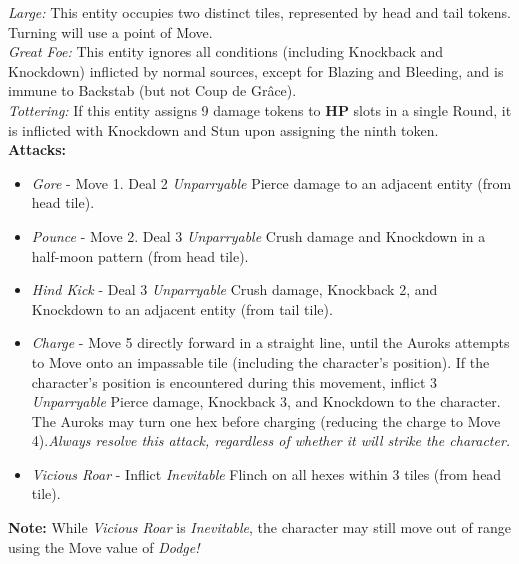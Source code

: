 \emph{Large:} This entity occupies two distinct tiles, represented by head and tail tokens. Turning will use a point of Move.\\

\emph{Great Foe:} This entity ignores all conditions (including Knockback and Knockdown) inflicted by normal sources, except for Blazing and Bleeding, and is immune to Backstab (but not Coup de Grâce).\\

\emph{Tottering:} If this entity assigns 9 damage tokens to \textbf{HP} slots in a single Round, it is inflicted with Knockdown and Stun upon assigning the ninth token.\\

\textbf{Attacks:}
\begin{itemize}
\item \emph{Gore} -  Move 1. Deal 2 \emph{Unparryable} Pierce damage to an adjacent entity (from head tile).
\item \emph{Pounce} - Move 2. Deal 3 \emph{Unparryable} Crush damage and Knockdown in a half-moon pattern (from head tile).
\item \emph{Hind Kick} - Deal 3 \emph{Unparryable} Crush damage, Knockback 2, and Knockdown to an adjacent entity (from tail tile).
\item \emph{Charge} - Move 5 directly forward in a straight line, until the Auroks attempts to Move onto an impassable tile (including the character’s position). If the character’s position is encountered during this movement, inflict 3 \emph{Unparryable} Pierce damage, Knockback 3, and Knockdown to the character. The Auroks may turn one hex before charging (reducing the charge to Move 4).\newline \emph{Always resolve this attack, regardless of whether it will strike the character.}
\item \emph{Vicious Roar} - Inflict \emph{Inevitable} Flinch on all hexes within 3 tiles (from head tile).
\end{itemize}

\begin{tcolorbox}
\textbf{Note:} While \emph{Vicious Roar} is \emph{Inevitable}, the character may still move out of range using the Move value of \emph{Dodge!}
\end{tcolorbox}

\pagebreak

